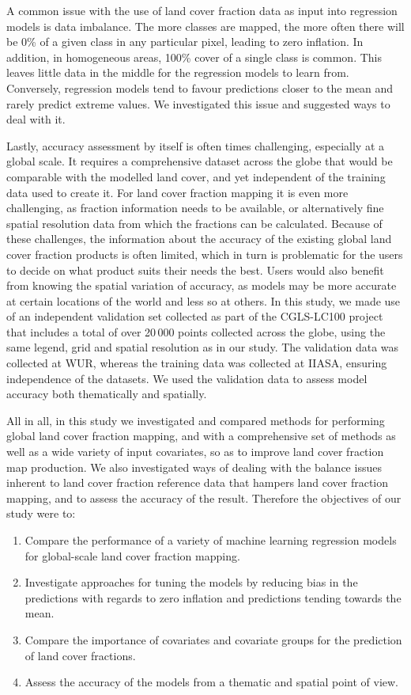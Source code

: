 \documentclass[review,authoryear,3p]{elsarticle}
\begin{document}
A common issue with the use of land cover fraction data as input into regression models is data imbalance.
The more classes are mapped, the more often there will be 0\% of a given class in any particular pixel, leading to zero inflation.
In addition, in homogeneous areas, 100\% cover of a single class is common.
This leaves little data in the middle for the regression models to learn from.
Conversely, regression models tend to favour predictions closer to the mean and rarely predict extreme values.
We investigated this issue and suggested ways to deal with it.

Lastly, accuracy assessment by itself is often times challenging, especially at a global scale.
It requires a comprehensive dataset across the globe that would be comparable with the modelled land cover, and yet independent of the training data used to create it.
For land cover fraction mapping it is even more challenging, as fraction information needs to be available, or alternatively fine spatial resolution data from which the fractions can be calculated.
Because of these challenges, the information about the accuracy of the existing global land cover fraction products is often limited, which in turn is problematic for the users to decide on what product suits their needs the best.
Users would also benefit from knowing the spatial variation of accuracy, as models may be more accurate at certain locations of the world and less so at others.
In this study, we made use of an independent validation set collected as part of the \gls{CGLS-LC100} project \citep{nandin-erdene_tsendbazar_copernicus_2019} that includes a total of over 20\,000 points collected across the globe, using the same legend, grid and spatial resolution as in our study.
The validation data was collected at \gls{WUR}, whereas the training data was collected at \gls{IIASA}, ensuring independence of the datasets.
We used the validation data to assess model accuracy both thematically and spatially.

All in all, in this study we investigated and compared methods for performing global land cover fraction mapping, and with a comprehensive set of methods as well as a wide variety of input covariates, so as to improve land cover fraction map production.
We also investigated ways of dealing with the balance issues inherent to land cover fraction reference data that hampers land cover fraction mapping, and to assess the accuracy of the result.
Therefore the objectives of our study were to:

\begin{enumerate}
 \item Compare the performance of a variety of machine learning regression models for global-scale land cover fraction mapping.
 \item Investigate approaches for tuning the models by reducing bias in the predictions with regards to zero inflation and predictions tending towards the mean.
 \item Compare the importance of covariates and covariate groups for the prediction of land cover fractions.
 \item Assess the accuracy of the models from a thematic and spatial point of view.
\end{enumerate}
\end{document}
